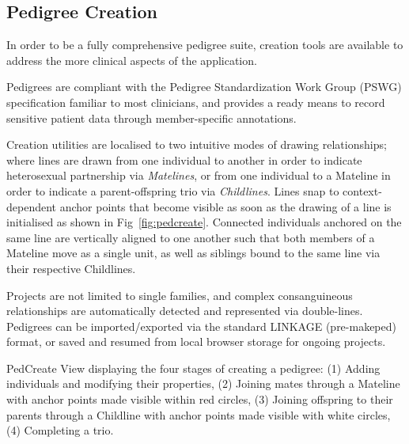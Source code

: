 
\subsection{Pedigree Creation}

In order to be a fully comprehensive pedigree suite, creation tools are available to address the more clinical aspects of the application.

Pedigrees are compliant with the Pedigree Standardization Work Group (PSWG) specification \citep{pswg1,pswg2} familiar to most clinicians, and provides a ready means to record sensitive patient data through member-specific annotations. 

Creation utilities are localised to two intuitive modes of drawing relationships; where lines are drawn from one individual to another in order to indicate heterosexual partnership via \textit{Matelines}, or from one individual to a Mateline in order to indicate a parent-offspring trio via \textit{Childlines}. Lines snap to context-dependent anchor points that become visible as soon as the drawing of a line is initialised as shown in Fig~\ref{fig:pedcreate}. Connected individuals anchored on the same line are vertically aligned to one another such that both members of a Mateline move as a single unit, as well as siblings bound to the same line via their respective Childlines.

Projects are not limited to single families, and complex consanguineous relationships are automatically detected and represented via double-lines. Pedigrees can be imported/exported via the standard LINKAGE (pre-makeped) format, or saved and resumed from local browser storage for ongoing projects.

	{PedCreate View displaying the four stages of creating a pedigree: (1) Adding individuals and modifying their properties, (2) Joining mates through a Mateline with anchor points made visible within red circles, (3) Joining offspring to their parents through a Childline with anchor points made visible with white circles, (4) Completing a trio.}


